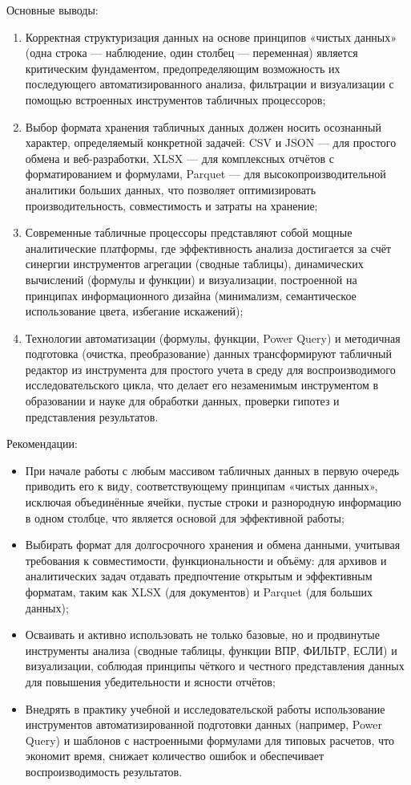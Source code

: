 \documentclass{SibFU-docs}
\begin{document}
Основные выводы:
\begin{enumerate}
\item Корректная структуризация данных на основе принципов «чистых данных» (одна строка — наблюдение, один столбец — переменная) является критическим фундаментом, предопределяющим возможность их последующего автоматизированного анализа, фильтрации и визуализации с помощью встроенных инструментов табличных процессоров;
\item Выбор формата хранения табличных данных должен носить осознанный характер, определяемый конкретной задачей: CSV и JSON — для простого обмена и веб-разработки, XLSX — для комплексных отчётов с форматированием и формулами, Parquet — для высокопроизводительной аналитики больших данных, что позволяет оптимизировать производительность, совместимость и затраты на хранение;
\item Современные табличные процессоры представляют собой мощные аналитические платформы, где эффективность анализа достигается за счёт синергии инструментов агрегации (сводные таблицы), динамических вычислений (формулы и функции) и визуализации, построенной на принципах информационного дизайна (минимализм, семантическое использование цвета, избегание искажений);
\item Технологии автоматизации (формулы, функции, Power Query) и методичная подготовка (очистка, преобразование) данных трансформируют табличный редактор из инструмента для простого учета в среду для воспроизводимого исследовательского цикла, что делает его незаменимым инструментом в образовании и науке для обработки данных, проверки гипотез и представления результатов.
\end{enumerate}

\vspace{1em}

Рекомендации:
\begin{itemize}[label=-]
\item При начале работы с любым массивом табличных данных в первую очередь приводить его к виду, соответствующему принципам «чистых данных», исключая объединённые ячейки, пустые строки и разнородную информацию в одном столбце, что является основой для эффективной работы;
\item Выбирать формат для долгосрочного хранения и обмена данными, учитывая требования к совместимости, функциональности и объёму: для архивов и аналитических задач отдавать предпочтение открытым и эффективным форматам, таким как XLSX (для документов) и Parquet (для больших данных);
\item Осваивать и активно использовать не только базовые, но и продвинутые инструменты анализа (сводные таблицы, функции ВПР, ФИЛЬТР, ЕСЛИ) и визуализации, соблюдая принципы чёткого и честного представления данных для повышения убедительности и ясности отчётов;
\item Внедрять в практику учебной и исследовательской работы использование инструментов автоматизированной подготовки данных (например, Power Query) и шаблонов с настроенными формулами для типовых расчетов, что экономит время, снижает количество ошибок и обеспечивает воспроизводимость результатов.
\end{itemize}
\end{document}
